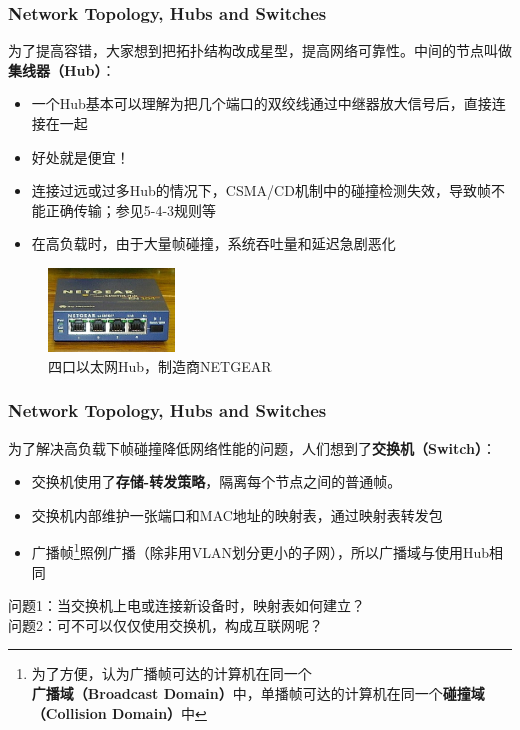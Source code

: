 \documentclass[11pt]{beamer}
\begin{document}
\begin{frame}
\frametitle{Network Topology, Hubs and Switches}
为了提高容错，大家想到把拓扑结构改成星型，提高网络可靠性。中间的节点叫做 \textbf{集线器（Hub）}：
\begin{itemize}
\item 一个Hub基本可以理解为把几个端口的双绞线通过中继器放大信号后，直接连接在一起
\item 好处就是便宜！
\item 连接过远或过多Hub的情况下，CSMA/CD机制中的碰撞检测失效，导致帧不能正确传输；参见5-4-3规则等
\item 在高负载时，由于大量帧碰撞，系统吞吐量和延迟急剧恶化
\end{itemize}

\begin{figure}
\includegraphics[width=0.3\textwidth]{300px-4_port_netgear_ethernet_hub.jpg}
\caption{四口以太网Hub，制造商NETGEAR}
\end{figure}
\end{frame}

\begin{frame}
\frametitle{Network Topology, Hubs and Switches}
为了解决高负载下帧碰撞降低网络性能的问题，人们想到了\textbf{交换机（Switch）}：
\begin{itemize}
\item 交换机使用了\textbf{存储-转发策略}，隔离每个节点之间的普通帧。
\item 交换机内部维护一张端口和MAC地址的映射表，通过映射表转发包
\item 广播帧\footnote{为了方便，认为广播帧可达的计算机在同一个\textbf{广播域（Broadcast Domain）}中，单播帧可达的计算机在同一个\textbf{碰撞域（Collision Domain）}中}照例广播（除非用VLAN划分更小的子网），所以广播域与使用Hub相同
\end{itemize}
问题1：当交换机上电或连接新设备时，映射表如何建立？\\
问题2：可不可以仅仅使用交换机，构成互联网呢？
\end{frame}
\end{document}
